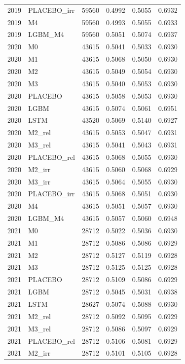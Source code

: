 \begin{tabular}{llrrrr}
2019 & PLACEBO\_irr & 59560 & 0.4992 & 0.5055 & 0.6932 \\
2019 & M4 & 59560 & 0.4993 & 0.5055 & 0.6933 \\
2019 & LGBM\_M4 & 59560 & 0.5051 & 0.5074 & 0.6937 \\
2020 & M0 & 43615 & 0.5041 & 0.5033 & 0.6930 \\
2020 & M1 & 43615 & 0.5068 & 0.5050 & 0.6930 \\
2020 & M2 & 43615 & 0.5049 & 0.5054 & 0.6930 \\
2020 & M3 & 43615 & 0.5040 & 0.5053 & 0.6930 \\
2020 & PLACEBO & 43615 & 0.5058 & 0.5053 & 0.6930 \\
2020 & LGBM & 43615 & 0.5074 & 0.5061 & 0.6951 \\
2020 & LSTM & 43520 & 0.5069 & 0.5140 & 0.6927 \\
2020 & M2\_rel & 43615 & 0.5053 & 0.5047 & 0.6931 \\
2020 & M3\_rel & 43615 & 0.5041 & 0.5043 & 0.6931 \\
2020 & PLACEBO\_rel & 43615 & 0.5068 & 0.5055 & 0.6930 \\
2020 & M2\_irr & 43615 & 0.5060 & 0.5068 & 0.6929 \\
2020 & M3\_irr & 43615 & 0.5064 & 0.5055 & 0.6930 \\
2020 & PLACEBO\_irr & 43615 & 0.5068 & 0.5051 & 0.6930 \\
2020 & M4 & 43615 & 0.5051 & 0.5057 & 0.6930 \\
2020 & LGBM\_M4 & 43615 & 0.5057 & 0.5060 & 0.6948 \\
2021 & M0 & 28712 & 0.5022 & 0.5036 & 0.6930 \\
2021 & M1 & 28712 & 0.5086 & 0.5086 & 0.6929 \\
2021 & M2 & 28712 & 0.5127 & 0.5119 & 0.6928 \\
2021 & M3 & 28712 & 0.5125 & 0.5125 & 0.6928 \\
2021 & PLACEBO & 28712 & 0.5109 & 0.5086 & 0.6929 \\
2021 & LGBM & 28712 & 0.5045 & 0.5031 & 0.6938 \\
2021 & LSTM & 28627 & 0.5074 & 0.5088 & 0.6930 \\
2021 & M2\_rel & 28712 & 0.5092 & 0.5095 & 0.6929 \\
2021 & M3\_rel & 28712 & 0.5086 & 0.5097 & 0.6929 \\
2021 & PLACEBO\_rel & 28712 & 0.5106 & 0.5081 & 0.6929 \\
2021 & M2\_irr & 28712 & 0.5101 & 0.5105 & 0.6928 \\

\end{tabular}
